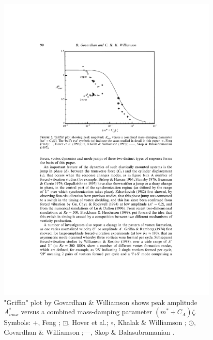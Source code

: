 \begin{figure}[tb]
	\centering
	\includegraphics[width=0.7\linewidth]{Figs/griffinplot1}
	\caption{"Griffin" plot by Govardhan \& Williamson \cite{GOVARDHAN2000} shows peak amplitude $A^*_{max}$ versus a combined mass-damping parameter $(m^*+ C_A)\zeta$. Symbols: +, Feng \cite{Feng1968}; $\boxdot$, Hover et al.\cite{Hover1998}; $ \circ $, Khalak \& Williamson \cite{KHALAK1999}; $ \odot $, Govardhan \& Williamson \cite{GOVARDHAN2000};---, Skop \& Balasubramanian \cite{Skop1997}. }
	\label{fig:griffinplot1}
\end{figure}


%



